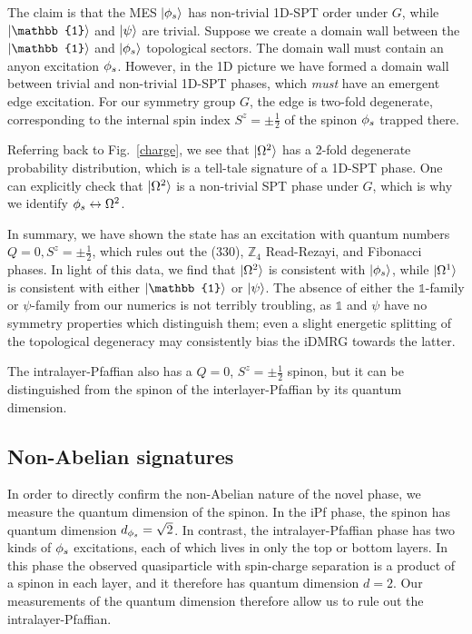 The claim is that the MES $\ket{{\phi_s}}$ has non-trivial 1D-SPT order under $G$, while $\ket{\mathbb{1}}$ and $\ket{\psi}$ are trivial. 
Suppose we create a domain wall between the $\ket{\mathbb{1}}$ and $\ket{{\phi_s}}$ topological sectors. 
The domain wall must contain an anyon excitation ${\phi_s}$. 
However, in the 1D picture we have formed a domain wall between  trivial and non-trivial 1D-SPT phases, which \emph{must}  have an emergent edge excitation.
For our symmetry group $G$, the edge is two-fold degenerate, corresponding to the internal spin index $S^z = \pm \frac{1}{2}$ of the spinon ${\phi_s}$ trapped there.

Referring back to Fig.~\ref{charge}, we see that $\ket{\Omega^2}$ has a 2-fold degenerate probability distribution, which is a tell-tale signature of a 1D-SPT phase.
One can explicitly check that $\ket{\Omega^2}$ is a non-trivial SPT phase under $G$, which is why we identify ${\phi_s} \leftrightarrow \Omega^2$.

In summary, we have shown the state has an excitation with quantum numbers $Q = 0, S^z = \pm \tfrac{1}{2}$, which rules out the (330),  $\mathbb{Z}_4$ Read-Rezayi, and  Fibonacci phases.
In light of this data, we find that $\ket{\Omega^2}$ is consistent with $\ket{{\phi_s}}$, while $\ket{\Omega^1}$ is consistent with either $\ket{\mathbb{1}}$ or $\ket{\psi}$.
The absence of either the $\mathbb{1}$-family or $\psi$-family from our numerics is not terribly troubling, as $\mathbb{1}$ and $\psi$ have no symmetry properties which distinguish them; even a slight energetic splitting of the topological degeneracy may consistently bias the iDMRG towards the latter.

The intralayer-Pfaffian also has a $Q = 0$, $S^z = \pm \tfrac{1}{2}$ spinon, but it can be distinguished from the spinon of the interlayer-Pfaffian by its quantum dimension.


\subsection{Non-Abelian signatures}\label{sec:nonabelian_sig}

In order to directly confirm the non-Abelian nature of the novel phase, we measure the quantum dimension of the spinon.
In the iPf phase, the spinon has quantum dimension $d_{{\phi_s}} = \sqrt{2}$. In contrast, the intralayer-Pfaffian phase has two kinds of ${\phi_s}$ excitations, each of which lives in only the top or bottom layers.
In this phase the observed quasiparticle with spin-charge separation is a product of a spinon in each layer, and it therefore has quantum dimension $d=2$.
Our measurements of the quantum dimension therefore allow us to rule out the intralayer-Pfaffian.

